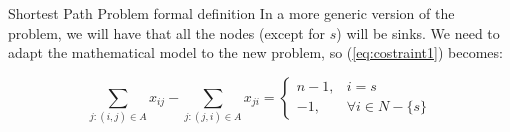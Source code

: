 \documentclass[9pt]{extarticle}
\begin{document}
\begin{section}{Shortest Path Problem formal definition}
        In a more generic version of the problem, we will have that all the nodes (except for $s$) will be sinks.
        We need to adapt the mathematical model to the new problem, so (\ref{eq:costraint1}) becomes:
        
        \begin{equation*}
            \sum_{j:(i,j) \in A} x_{ij} - \sum_{j:(j,i) \in A} x_{ji} = 
            \begin{cases}
                n-1,    & i=s \\
                -1,      & \forall i \in N - \{s\}
            \end{cases}
        \end{equation*}
        \vspace{10px}

    \end{section}
\end{document}
